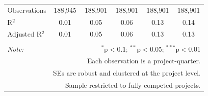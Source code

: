 \documentclass[
]{article}
\begin{document}
\begin{table}[H]
\begin{tabular}{@{\extracolsep{-2pt}}lccccc}
Observations & 188,945 & 188,901 & 188,901 & 188,901 & 188,901 \\ 
R$^{2}$ & 0.01 & 0.05 & 0.06 & 0.13 & 0.14 \\ 
Adjusted R$^{2}$ & 0.01 & 0.05 & 0.06 & 0.13 & 0.13 \\ 
\hline 
\hline \\[-1.8ex] 
\textit{Note:}  & \multicolumn{5}{r}{$^{*}$p$<$0.1; $^{**}$p$<$0.05; $^{***}$p$<$0.01} \\ 
 & \multicolumn{5}{r}{Each observation is a project-quarter.} \\ 
 & \multicolumn{5}{r}{SEs are robust and clustered at the project level.} \\ 
 & \multicolumn{5}{r}{Sample restricted to fully competed projects.} \\ 
\end{tabular} 
\end{table}
\end{document}
